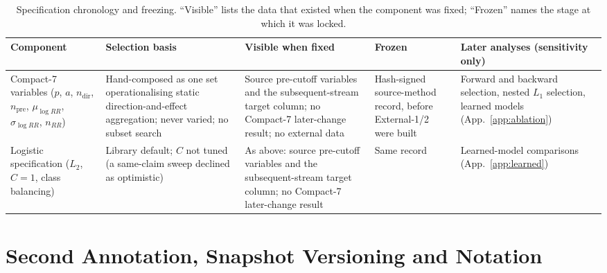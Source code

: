 \documentclass[11pt]{article}
\newcommand{\compact}{Compact-7\xspace}
\begin{document}
\begin{table}[!t]\centering\scriptsize
\setlength{\tabcolsep}{3pt}
\begin{tabular}{@{}p{}p{}p{}p{}p{}@{}}
\toprule
Component & Selection basis & Visible when fixed & Frozen & Later analyses (sensitivity only) \\
\midrule
\compact variables ($p$, $a$, $n_{\text{dir}}$, $n_{\text{pre}}$, $\mu_{\log RR}$, $\sigma_{\log RR}$, $n_{RR}$) & Hand-composed as one set operationalising static direction-and-effect aggregation; never varied; no subset search & Source pre-cutoff variables and the subsequent-stream target column; no \compact later-change result; no external data & Hash-signed source-method record, before External-1/2 were built & Forward and backward selection, nested $L_1$ selection, learned models (App.~\ref{app:ablation}) \\
Logistic specification ($L_2$, $C=1$, class balancing) & Library default; $C$ not tuned (a same-claim sweep declined as optimistic) & As above: source pre-cutoff variables and the subsequent-stream target column; no \compact later-change result & Same record & Learned-model comparisons (App.~\ref{app:learned}) \\
\bottomrule
\end{tabular}
\caption{Specification chronology and freezing. ``Visible'' lists the data that existed when the
component was fixed; ``Frozen'' names the stage at which it was locked.}
\label{tab:chronology}
\end{table}

\section{Second Annotation, Snapshot Versioning and Notation}
\label{app:release}
\end{document}
